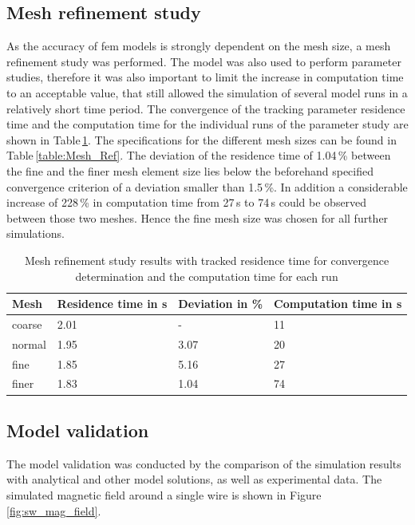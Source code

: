 \subsection{Mesh refinement study}
\label{subsec:mesh_ref}
As the accuracy of \gls{fem} models is strongly dependent on the mesh size, a mesh refinement study was performed. The model was also used to perform parameter studies, therefore it was also important to limit the increase in computation time to an acceptable value, that still allowed the simulation of several model runs in a  relatively short time period. The convergence of the tracking parameter residence time and the computation time for the individual runs of the parameter study are shown in Table\,\ref{table:Mesh_Ref_res}. The specifications for the different mesh sizes can be found in Table\,\ref{table:Mesh_Ref}. The deviation of the residence time of 1.04\,\% between the fine and the finer mesh element size lies below the beforehand specified convergence criterion of a deviation smaller than 1.5\,\%. In addition a considerable increase of 228\,\% in computation time from 27\,s to 74\,s could be observed between those two meshes. Hence the fine mesh size was chosen for all further simulations. 

\begin{table}[H]
\centering
\caption[Mesh refinement study results]{Mesh refinement study results with tracked residence time for convergence determination and the computation time for each run}
\label{table:Mesh_Ref_res}
\begin{tabularx}{\textwidth}{XXXX}
\hline
Mesh & Residence time in s & Deviation in \% & Computation time in s\\
\hline\hline
coarse &  2.01 & -  & 11\\
normal & 1.95 & 3.07 & 20\\
fine &  1.85 & 5.16 & 27 \\
finer &  1.83 & 1.04 & 74\\
\hline
\end{tabularx}
\end{table}

\subsection{Model validation}
\label{subsec:mod_val}

The model validation was conducted by the comparison of the simulation results with analytical and other model solutions, as well as experimental data.
The simulated magnetic field around a single wire is shown in Figure\,\ref{fig:sw_mag_field}. 

